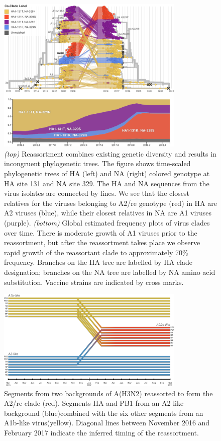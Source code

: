 \begin{figure}[b]
    \begin{center}
    \includegraphics[width=0.8\textwidth]{figures/ha_na_tangle.png}
    \end{center}
    \caption{\textit{(top)} Reassortment combines existing genetic diversity and results in incongruent phylogenetic trees. The figure shows time-scaled phylogenetic trees of HA (left) and NA (right) colored genotype at HA site 131 and NA site 329. The HA and NA sequences from the virus isolates are connected by lines. We see that the closest relatives for the viruses belonging to A2/re genotype (red) in HA are A2 viruses (blue), while their closest relatives in NA are A1 viruses (purple). \textit{(bottom)} Global estimated frequency plots of virus clades over time. There is moderate growth of A1 viruses prior to the reassortment, but after the reassortment takes place we observe rapid growth of the reassortant clade to approximately 70\% frequency. Branches on the HA tree are labelled by HA clade designation; branches on the NA tree are labelled by NA amino acid substitution. Vaccine strains are indicated by cross marks.}
    \label{fig:tangle}
\end{figure}

\begin{figure}[b]
    \begin{center}
    \includegraphics[width=0.8\textwidth]{figures/railroad_plot.png}
    \end{center}
    \caption{Segments from two backgrounds of A(H3N2) reassorted to form the A2/re clade (red). Segments HA and PB1 from an A2-like background (blue)combined with the six other segments from an A1b-like virus(yellow). Diagonal lines between November 2016 and February 2017 indicate the inferred timing of the reassortment.}
    \label{fig:railroad}
\end{figure}
